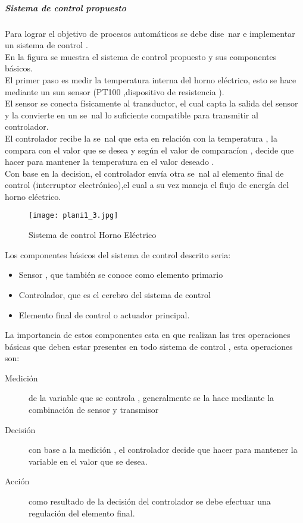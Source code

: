 \documentclass[Spanish,12pt,doublespace,german,letterpaper,dvipdfm]{article}
\begin{document}
\subparagraph{Sistema de control propuesto} Para lograr el
objetivo de procesos automáticos se debe dise~nar
e implementar un sistema de control .\\
En la figura  se muestra el sistema de control propuesto y sus
componentes básicos.\\
El primer paso es medir la temperatura interna del horno
eléctrico, esto se hace mediante un sun sensor (PT100
,dispositivo de resistencia ).\\
El sensor se conecta físicamente al transductor, el cual capta  la
salida del sensor y la convierte en un se~nal lo suficiente
compatible para transmitir al controlador.\\
El controlador recibe la se~nal que esta en relación con la
temperatura , la compara con el valor que se desea y seg\'un el
valor de comparac\'ion , decide que hacer para mantener la
temperatura en el valor deseado .\\
Con base en la decision, el controlador envía otra se~nal al
elemento final de control (interruptor electrónico),el cual a su
vez maneja el flujo de energía del horno eléctrico.\\

\begin{figure}[h!]
\begin{center}
 \texttt{[image: plani1\_3.jpg]}
\end{center}
\caption{Sistema de control Horno Eléctrico }
\end{figure}

Los componentes b\'asicos del sistema de control descrito seria:
\begin{itemize}
  \item Sensor , que también se conoce como elemento primario
  \item Controlador, que es el cerebro del sistema de control
  \item Elemento final de control o actuador principal.
\end{itemize}
La importancia de estos componentes esta en que realizan las tres
operaciones básicas que deben estar presentes en todo sistema de
control , esta operaciones son:
\begin{description}
  \item[Medici\'on]  de la variable que se controla ,
  generalmente se la hace mediante la combinaci\'on de sensor y
  transmisor
  \item[Decisi\'on] con base a la medici\'on , el controlador
  decide que hacer para mantener la variable en el valor que se
  desea.
  \item[Acci\'on] como resultado de la decisi\'on del controlador
  se debe efectuar una regulaci\'on del elemento final.
\end{description}
\end{document}
